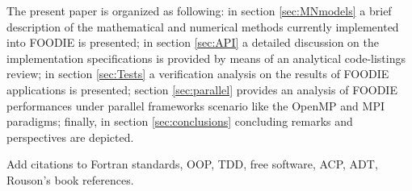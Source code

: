 The present paper is organized as following: in section \ref{sec:MNmodels} a brief description of the mathematical and numerical methods currently implemented into FOODIE is presented; in section \ref{sec:API} a detailed discussion on the implementation specifications is provided by means of an analytical code-listings review; in section \ref{sec:Tests} a verification analysis on the results of FOODIE applications is presented; section \ref{sec:parallel} provides an analysis of FOODIE performances under parallel frameworks scenario like the OpenMP and MPI paradigms; finally, in section \ref{sec:conclusions} concluding remarks and perspectives are depicted.

{\color{red} Add citations to Fortran standards, OOP, TDD, free software, ACP, ADT, Rouson's book references.}

